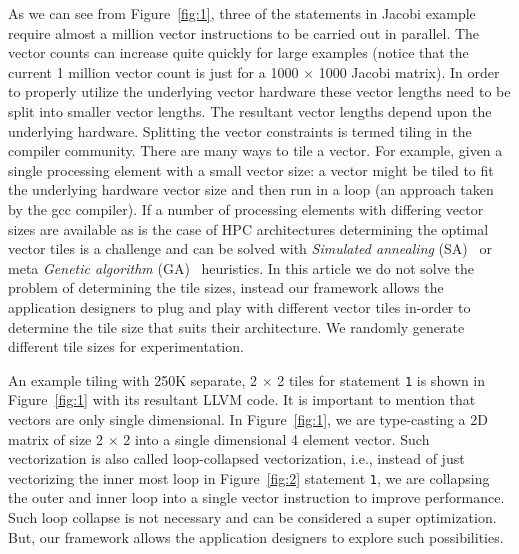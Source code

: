 As we can see from Figure~\ref{fig:1}, three of the statements in Jacobi
example require almost a million vector instructions to be carried out
in parallel. The vector counts can increase quite quickly for large
examples (notice that the current 1 million vector count is just for a
1000 $\times$ 1000 Jacobi matrix). In order to properly utilize the
underlying vector hardware these vector lengths need to be split into
smaller vector lengths. The resultant vector lengths depend upon the
underlying hardware. Splitting the vector constraints is termed tiling
in the compiler community. There are many ways to tile a vector. For
example, given a single processing element with a small vector size: a
vector might be tiled to fit the underlying hardware vector size and
then run in a loop (an approach taken by the gcc compiler). If a number
of processing elements with differing vector sizes are available as is
the case of HPC architectures determining the optimal vector tiles is a
challenge and can be solved with \textit{Simulated annealing}
(SA)~\cite{tbra01} or meta \textit{Genetic algorithm} (GA)~\cite{tbra01}
heuristics. In this article we do not solve the problem of determining
the tile sizes, instead our framework allows the application designers
to plug and play with different vector tiles in-order to determine the
tile size that suits their architecture. We randomly generate different
tile sizes for experimentation.

An example tiling with 250K separate, 2 $\times$ 2 tiles for statement
\texttt{1} is shown in Figure~\ref{fig:1} with its resultant LLVM
code. It is important to mention that vectors are only single
dimensional. In Figure~\ref{fig:1}, we are type-casting a 2D matrix of
size 2 $\times$ 2 into a single dimensional 4 element vector. Such
vectorization is also called loop-collapsed vectorization, i.e., instead
of just vectorizing the inner most loop in Figure~\ref{fig:2} statement
\texttt{1}, we are collapsing the outer and inner loop into a single
vector instruction to improve performance. Such loop collapse is not
necessary and can be considered a super optimization. But, our framework
allows the application designers to explore such possibilities.

